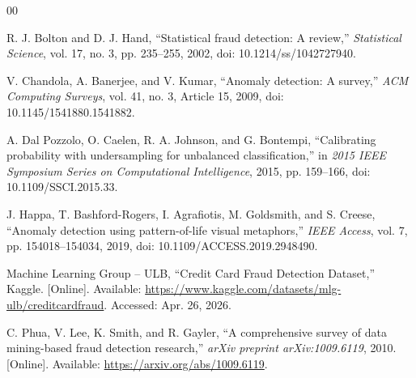 \documentclass[conference]{IEEEtran}
\begin{document}
\begin{thebibliography}{00}

R. J. Bolton and D. J. Hand, ``Statistical fraud detection: A review,'' \emph{Statistical Science}, vol. 17, no. 3, pp. 235--255, 2002, doi: 10.1214/ss/1042727940.

V. Chandola, A. Banerjee, and V. Kumar, ``Anomaly detection: A survey,'' \emph{ACM Computing Surveys}, vol. 41, no. 3, Article 15, 2009, doi: 10.1145/1541880.1541882.

A. Dal Pozzolo, O. Caelen, R. A. Johnson, and G. Bontempi, ``Calibrating probability with undersampling for unbalanced classification,'' in \emph{2015 IEEE Symposium Series on Computational Intelligence}, 2015, pp. 159--166, doi: 10.1109/SSCI.2015.33.

J. Happa, T. Bashford-Rogers, I. Agrafiotis, M. Goldsmith, and S. Creese, ``Anomaly detection using pattern-of-life visual metaphors,'' \emph{IEEE Access}, vol. 7, pp. 154018--154034, 2019, doi: 10.1109/ACCESS.2019.2948490.

Machine Learning Group -- ULB, ``Credit Card Fraud Detection Dataset,'' Kaggle. [Online]. Available: \url{https://www.kaggle.com/datasets/mlg-ulb/creditcardfraud}. Accessed: Apr. 26, 2026.

C. Phua, V. Lee, K. Smith, and R. Gayler, ``A comprehensive survey of data mining-based fraud detection research,'' \emph{arXiv preprint arXiv:1009.6119}, 2010. [Online]. Available: \url{https://arxiv.org/abs/1009.6119}.

\end{thebibliography}
\end{document}
